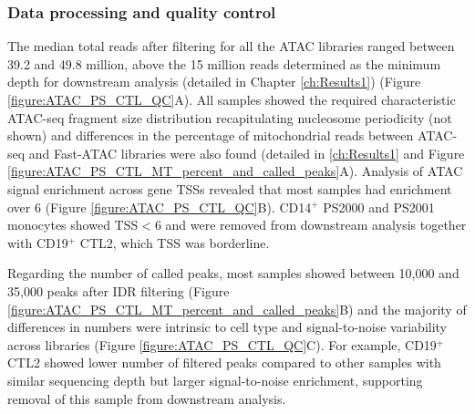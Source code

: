 \subsubsection{Data processing and quality control}
The median total reads after filtering for all the ATAC libraries ranged between 39.2 and 49.8 million, above the 15 million reads determined as the minimum depth for downstream analysis (detailed in Chapter \ref{ch:Results1}) (Figure \ref{figure:ATAC_PS_CTL_QC}A). All samples showed the required characteristic ATAC-seq fragment size distribution recapitulating nucleosome periodicity (not shown) and differences in the percentage of mitochondrial reads between ATAC-seq and Fast-ATAC libraries were also found (detailed in \ref{ch:Results1} and Figure \ref{figure:ATAC_PS_CTL_MT_percent_and_called_peaks}A). Analysis of ATAC signal enrichment across gene TSSs revealed that most samples had enrichment over 6 (Figure \ref{figure:ATAC_PS_CTL_QC}B). CD14$^+$ PS2000 and PS2001 monocytes showed TSS$<$6 and were removed from downstream analysis together with CD19$^+$ CTL2, which TSS was borderline.  %

Regarding the number of called peaks, most samples showed between 10,000 and 35,000 peaks after IDR filtering (Figure \ref{figure:ATAC_PS_CTL_MT_percent_and_called_peaks}B) and the majority of differences in numbers were intrinsic to cell type and signal-to-noise variability across libraries (Figure \ref{figure:ATAC_PS_CTL_QC}C). For example, CD19$^+$ CTL2 showed lower number of filtered peaks compared to other samples with similar sequencing depth but larger signal-to-noise enrichment, supporting removal of this sample from downstream analysis.


